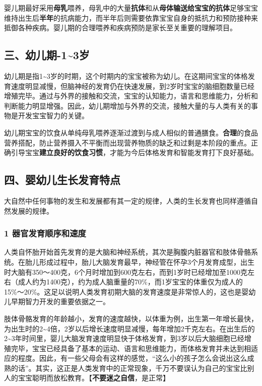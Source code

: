 \documentclass[
]{article}
\begin{document}
婴儿期最好采用\textbf{母乳}喂养，母乳中的大量\textbf{抗体}和从\textbf{母体输送给宝宝的抗体}足够宝宝维持出生后\textbf{半年}的抗病能力，而半年后则需要依靠宝宝自身的抵抗力和预防接种来抵御各种疾病。婴儿期的合理喂养和疾病预防是家长至关重要的理解项目。

\hypertarget{ux4e09ux5e7cux513fux671f-13ux5c81}{%
\subsection{三、幼儿期-1\textasciitilde3岁}\label{ux4e09ux5e7cux513fux671f-13ux5c81}}

幼儿期是指1\textasciitilde3岁的时期，这个时期内的宝宝被称为幼儿。在这期间宝宝的体格发育速度明显减慢，但脑神经的发育仍在快速发展，到2岁时宝宝的脑细胞数量已经增殖完毕。通过与外界的接触和交流，宝宝的认知能力，语言和思维能力，分析和判断能力明显增强。因此，幼儿期增加与外界的交流，接触大量的与人类有关的事物是开发宝宝智力的关键。

幼儿期宝宝的饮食从单纯母乳喂养逐渐过渡到与成人相似的普通膳食。\textbf{合理}的食品营养搭配，防止营养摄入不平衡而出现营养物质的缺乏和过剩是本阶段的重点。正确引导宝宝\textbf{建立良好的饮食习惯}，才能为今后体格发育和智能发育打下良好基础。

\hypertarget{ux56dbux5a74ux5e7cux513fux751fux957fux53d1ux80b2ux7279ux70b9}{%
\subsection{四、婴幼儿生长发育特点}\label{ux56dbux5a74ux5e7cux513fux751fux957fux53d1ux80b2ux7279ux70b9}}

大自然中任何事物的发生和发展都有其一定的规律，人类的生长发育也同样遵循自然发展的规律。

\hypertarget{ux5668ux5b98ux53d1ux80b2ux987aux5e8fux548cux901fux5ea6}{%
\subsubsection{1
器官发育顺序和速度}\label{ux5668ux5b98ux53d1ux80b2ux987aux5e8fux548cux901fux5ea6}}

人类自怀胎开始首先发育的是大脑和神经系统，其次是胸腹内脏器官和肢体骨骼系统。在胎儿形成过程中，胎儿大脑发育最早，神经管在怀孕3个月发育成型，出生时大脑有350〜400克，6个月时增加到600克左右，而到1岁时已经增加至1000克左右（成人约为1400克），约为成人脑重量的70\%，而1岁宝宝的体重仅为成人的15\%〜20\%。这足以说明人类发育初期大脑的发育速度是非常惊人的，这也是婴幼儿早期智力开发的重要依据之一。

肢体骨骼发育的年龄越小，发育的速度越快，以体重为例，出生第一年增长最快，为出生时的2\textasciitilde4倍，2岁以后增长速度明显减慢，每年增加2千克左右。在出生后的2\textasciitilde3年时间里，婴儿大脑发育速度明显快于体格发育，到3岁以后大脑细胞已经增殖完毕，宝宝已经具备了基本的运动、语言和思维能力，而体格发育并未达到相适应的程度。因此，有一些父母会有这样的感觉，``这么小的孩子怎么会说出这么成熟的话''。其实，这正是人类发育中的正常现象，千万不要误认为自己的宝宝比别人的宝宝聪明而放松教育。【\textbf{不要迷之自信}，是正常】
\end{document}
